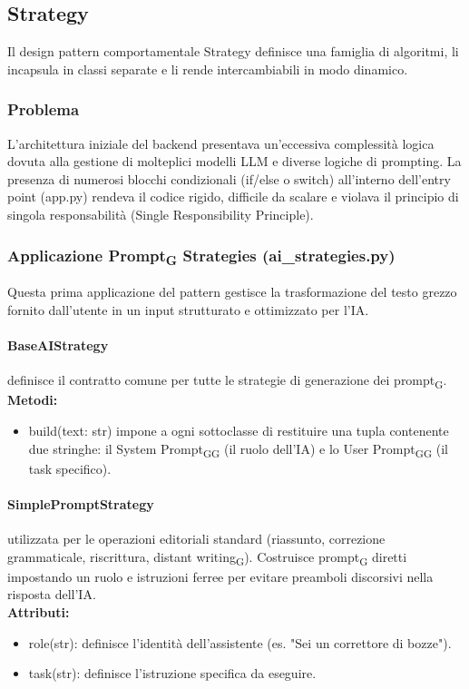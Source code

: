 \documentclass[11pt,a4paper]{article}
\newcommand{\gls}[1]{#1\textsubscript{G}}
\begin{document}
\subsection{Strategy}
Il design pattern comportamentale Strategy definisce una famiglia di algoritmi, li incapsula in classi separate e li rende intercambiabili in modo dinamico.
\subsubsection{Problema}
L’architettura iniziale del backend presentava un'eccessiva complessità logica dovuta alla gestione di molteplici modelli LLM e diverse logiche di prompting. La presenza di numerosi blocchi condizionali (if/else o switch) all'interno dell'entry point (app.py) rendeva il codice rigido, difficile da scalare e violava il principio di singola responsabilità (Single Responsibility Principle).
\subsubsection{Applicazione \gls{Prompt} Strategies (ai\_strategies.py)}
Questa prima applicazione del pattern gestisce la trasformazione del testo grezzo fornito dall'utente in un input strutturato e ottimizzato per l'IA.

\paragraph{BaseAIStrategy} definisce il contratto comune per tutte le strategie di generazione dei \gls{prompt}.
\textbf{Metodi:}
\begin{itemize}
    \item build(text: str) impone a ogni sottoclasse di restituire una tupla contenente due stringhe: il \gls{System \gls{Prompt}} (il ruolo dell'IA) e lo \gls{User \gls{Prompt}} (il task specifico).
\end{itemize}
\paragraph{SimplePromptStrategy} utilizzata per le operazioni editoriali standard (riassunto, correzione grammaticale, riscrittura, \gls{distant writing}). Costruisce \gls{prompt} diretti impostando un ruolo e istruzioni ferree per evitare preamboli discorsivi nella risposta dell'IA.\\
\textbf{Attributi:}
\begin{itemize}
    \item role(str): definisce l'identità dell'assistente (es. "Sei un correttore di bozze").
    \item task(str): definisce l'istruzione specifica da eseguire.
\end{itemize}
\end{document}
